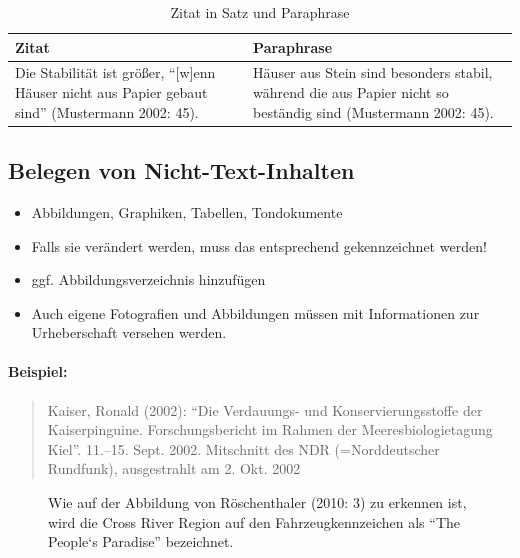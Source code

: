 \documentclass[ 12pt,
                titlepage,
                parskip=half,
                version=first,
                bibliography=totocnumbered,
                final,
                listof=totoc]{scrartcl}
\begin{document}
\begin{table}[h]
\centering
\begin{tabular}{ll}
\toprule
\textbf{Zitat} & \textbf{Paraphrase}\\
\midrule
\parbox[t]{0.4\linewidth}{Die Stabilität ist größer, \enquote{[w]enn Häuser
nicht aus Papier gebaut sind} (Mustermann 2002: 45).} &
\parbox[t]{0.4\linewidth}{Häuser aus Stein sind besonders stabil, während die
aus Papier nicht so beständig sind (Mustermann 2002: 45).}\\
\bottomrule
\end{tabular}
\caption{Zitat in Satz und Paraphrase}
\end{table}

\subsection{Belegen von Nicht-Text-Inhalten}

\begin{itemize}
    \item Abbildungen, Graphiken, Tabellen, Tondokumente
    \item Falls sie verändert werden, muss das entsprechend gekennzeichnet
    werden!
    \item ggf. Abbildungsverzeichnis hinzufügen
    \item Auch eigene Fotografien und Abbildungen müssen mit Informationen zur
    Urheberschaft versehen werden.
\end{itemize}

\paragraph{Beispiel:}
\begin{quote}
Kaiser, Ronald (2002): \enquote{Die Verdauungs- und Konservierungsstoffe der
Kaiserpinguine. Forschungsbericht im Rahmen der Meeresbiologietagung Kiel}.
11.--15. Sept. 2002. Mitschnitt des NDR (=Norddeutscher Rundfunk), ausgestrahlt
am 2. Okt. 2002
\end{quote}

\begin{figure}[ht!]
\centering
{}
\caption[Beispiel einer Abbildung]{Wie auf der Abbildung von Röschenthaler (2010: 3) zu erkennen ist, wird
die Cross River Region auf den Fahrzeugkennzeichen als \enquote{The People‘s
Paradise} bezeichnet.}
\label{img:grafik1}
\end{figure}
\end{document}
